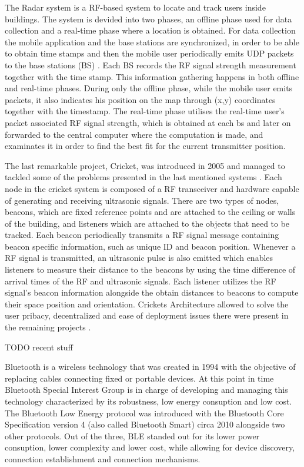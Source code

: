 \documentclass[a4paper]{IEEEtran}
\begin{document}
The Radar system is a RF-based system to locate and track users inside buildings. The system is devided into two phases, an offline phase used for data collection and a real-time phase where a location is obtained. For data collection the mobile application and the base stations are synchronized, in order to be able to obtain time stamps and then the mobile user periodically emits UDP packets to the base stations (BS) . Each BS records the RF signal strength measurement together with the time stamp. This information gathering happens in both offline and real-time phases. During only the offline phase, while the mobile user emits packets, it also indicates his position on the map through (x,y) coordinates together with the timestamp. The real-time phase utilises the real-time user's packet associated RF signal strength, which is obtained at each bs and later on forwarded to the central computer where the computation is made, and examinates it in order to find the best fit for the current transmitter position.

The last remarkable project, Cricket, was introduced in 2005 and managed to tackled some of the problems presented in the last mentioned systems \cite{cricket1}. Each node in the cricket system is composed of a RF transceiver and hardware capable of generating and receiving ultrasonic signals. There are two types of nodes, beacons, which are fixed reference points and are attached to the ceiling or walls of the building, and listeners which are attached to the objects that need to be tracked. Each beacon periodically transmits a RF signal message containing beacon specific information, such as unique ID and beacon position. Whenever a RF signal is transmitted, an ultrasonic pulse is also emitted which enables listeners to measure their distance to the beacons by using the time difference of arrival times of the RF and ultrasonic signals. Each listener utilizes the RF signal's beacon information alongside the obtain distances to beacons to compute their space position and orientation. Crickets Architecture allowed to solve the user pribacy, decentralized and ease of deployment issues there were present in the remaining projects \cite{cricket}.




TODO recent stuff



Bluetooth is a wireless technology that was created in 1994 with the objective of replacing cables connecting fixed or portable devices. At this point in time Bluetooth Special Interest Group is in charge of developing and managing this technology characterized by its robustness, low energy consuption and low cost. The Bluetooth Low Energy protocol was introduced with the Bluetooth Core Specification version 4 (also called Bluetooth Smart) circa 2010 alongside two other protocols.  Out of the three, BLE standed out for its lower power consuption, lower complexity and lower cost, while allowing for  device discovery, connection establishment and connection mechanisms. 
\end{document}

